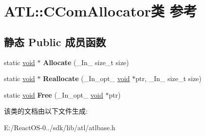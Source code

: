\hypertarget{class_a_t_l_1_1_c_com_allocator}{}\section{A\+TL\+:\+:C\+Com\+Allocator类 参考}
\label{class_a_t_l_1_1_c_com_allocator}
\subsection*{静态 Public 成员函数}
\begin{DoxyCompactItemize}
\item 
\mbox{\label{class_a_t_l_1_1_c_com_allocator_ace17f7269d4100aeb9c1dc2b55bea674}} 
static \hyperlink{interfacevoid}{void} $\ast$ {\bfseries Allocate} (\+\_\+\+In\+\_\+ size\+\_\+t size)
\item 
\mbox{\label{class_a_t_l_1_1_c_com_allocator_abf7a698f1d28bbf185f0039c9928f53f}} 
static \hyperlink{interfacevoid}{void} $\ast$ {\bfseries Reallocate} (\+\_\+\+In\+\_\+opt\+\_\+ \hyperlink{interfacevoid}{void} $\ast$ptr, \+\_\+\+In\+\_\+ size\+\_\+t size)
\item 
\mbox{\label{class_a_t_l_1_1_c_com_allocator_abfd90a988b3d331788df8342d97924b8}} 
static \hyperlink{interfacevoid}{void} {\bfseries Free} (\+\_\+\+In\+\_\+opt\+\_\+ \hyperlink{interfacevoid}{void} $\ast$ptr)
\end{DoxyCompactItemize}


该类的文档由以下文件生成\+:\begin{DoxyCompactItemize}
\item 
E\+:/\+React\+O\+S-\/0../sdk/lib/atl/atlbase.\+h\end{DoxyCompactItemize}
